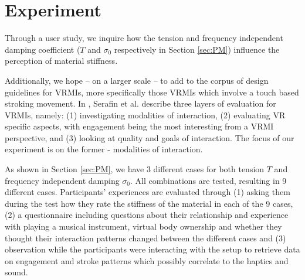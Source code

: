\documentclass{article}
\begin{document}
\section{Experiment}\label{sec:exp}

Through a user study, we inquire how the tension and frequency independent damping coefficient ($T$ and $\sigma_0$ respectively in Section \ref{sec:PM}) influence the perception of material stiffness.
 
Additionally, we hope -- on a larger scale -- to add to the corpus of design guidelines for VRMIs, more specifically those VRMIs which involve a touch based stroking movement. In \cite{Serafin:2016}, Serafin et al. describe three layers of evaluation for VRMIs, namely: (1) investigating modalities of interaction, (2) evaluating VR specific aspects, with engagement being the most interesting from a VRMI perspective, and (3) looking at quality and goals of interaction. The focus of our experiment is on the former - modalities of interaction.

As shown in Section \ref{sec:PM}, we have 3 different cases for both tension $T$ and frequency independent damping $\sigma_0$. All combinations are tested, resulting in 9 different cases. Participants' experiences are evaluated through (1) asking them during the test how they rate the stiffness of the material in each of the 9 cases, (2) a questionnaire including questions about their relationship and experience with playing a musical instrument, virtual body ownership and whether they thought their interaction patterns changed between the different cases and (3) observation while the participants were interacting with the setup to retrieve data on engagement and stroke patterns which possibly correlate to the haptics and sound.
\end{document}
